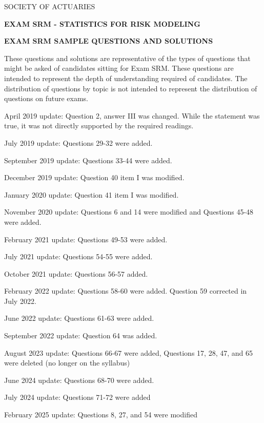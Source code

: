 \begin{center}
  {SOCIETY OF ACTUARIES\par}
  \vspace{1.2em}
  {\bfseries EXAM SRM - STATISTICS FOR RISK MODELING\par}
  \vspace{1.2em}
  {\bfseries EXAM SRM SAMPLE QUESTIONS AND SOLUTIONS\par}
\end{center}
\vspace{1em}

These questions and solutions are representative of the types of questions that might be asked of candidates sitting for Exam SRM. These questions are intended to represent the depth of understanding required of candidates. The distribution of questions by topic is not intended to represent the distribution of questions on future exams.

April 2019 update: Question 2, answer III was changed. While the statement was true, it was not directly supported by the required readings.

July 2019 update: Questions 29-32 were added.

September 2019 update: Questions 33-44 were added.

December 2019 update: Question 40 item I was modified.

January 2020 update: Question 41 item I was modified.

November 2020 update: Questions 6 and 14 were modified and Questions 45-48 were added.

February 2021 update: Questions 49-53 were added.

July 2021 update: Questions 54-55 were added.

October 2021 update: Questions 56-57 added.

February 2022 update: Questions 58-60 were added. Question 59 corrected in July 2022.

June 2022 update: Questions 61-63 were added.

September 2022 update: Question 64 was added.

August 2023 update: Questions 66-67 were added, Questions 17, 28, 47, and 65 were deleted (no longer on the syllabus)

June 2024 update: Questions 68-70 were added.

July 2024 update: Questions 71-72 were added

February 2025 update: Questions 8, 27, and 54 were modified


